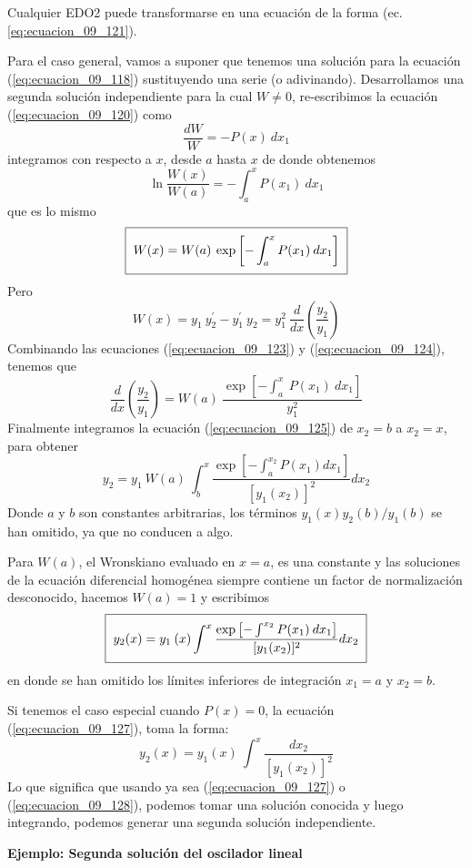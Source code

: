 Cualquier EDO2 puede transformarse en una ecuación de la forma (ec. \ref{eq:ecuacion_09_121}).
\par
Para el caso general, vamos a suponer que tenemos una solución para la ecuación (\ref{eq:ecuacion_09_118}) sustituyendo una serie (o adivinando). Desarrollamos una segunda solución independiente para la cual $W \neq 0$, re-escribimos la ecuación (\ref{eq:ecuacion_09_120}) como
\[ \dfrac{d W}{W} = - P(x) \: d x_{1} \]
integramos con respecto a $x$, desde $a$ hasta $x$ de donde obtenemos
\[ \ln \dfrac{W(x)}{W(a)} = - \int_{a}^{x} P(x_{1}) \: dx_{1}  \]
que es lo mismo
\begin{equation}
\setlength{\fboxsep}{2\fboxsep}\boxed{W(x) = W(a) \: \exp \left[ - \int_{a}^{x} P(x_{1}) \: d x_{1} \right]}
\label{eq:ecuacion_09_123}
\end{equation}
Pero
\begin{equation}
W(x) = y_{1} \: y^{\prime}_{2} - y^{\prime}_{1} \: y_{2} = y_{1}^{2} \: \dfrac{d}{dx} \left( \dfrac{y_{2}}{y_{1}} \right)
\label{eq:ecuacion_09_124}
\end{equation}
Combinando las ecuaciones (\ref{eq:ecuacion_09_123}) y (\ref{eq:ecuacion_09_124}), tenemos que
\begin{equation}
\dfrac{d}{dx} \left( \dfrac{y_{2}}{y_{1}} \right) =  W(a) \: \dfrac{\exp \left[ - \int_{a}^{x} \: P(x_{1}) \: d x_{1} \right]}{y^{2}_{1}}
\label{eq:ecuacion_09_125}
\end{equation}
Finalmente integramos la ecuación (\ref{eq:ecuacion_09_125}) de $x_{2} = b$ a $x_{2} = x$, para obtener
\begin{equation}
y_{2} = y_{1} \: W(a) \: \int_{b}^{x} \dfrac{\exp \left[ - \int_{a}^{x_{2}} P(x_{1}) d x_{1} \right]}{[y_{1}(x_{2})]^{2}} dx_{2}
\label{eq:ecuacion_09_126}
\end{equation}
Donde $a$ y $b$ son constantes arbitrarias, los términos $y_{1}(x)y_{2}(b)/y_{1}(b)$ se han omitido, ya que no conducen a algo.
\par
Para $W(a)$, el Wronskiano evaluado en $x=a$, es una constante y las soluciones de la ecuación diferencial homogénea siempre contiene un factor de normalización desconocido, hacemos $W(a)=1$ y escribimos
\begin{equation}
\setlength{\fboxsep}{2\fboxsep}\boxed{y_{2}(x) =  y_{1} \: (x) \int^{x} \dfrac{\exp \left[ - \int^{x_{2}} P(x_{1}) \: d x_{1} \right]}{[y_{1}(x_{2})]^{2}} dx_{2}}
\label{eq:ecuacion_09_127}
\end{equation}
en donde se han omitido los límites inferiores de integración $x_{1} = a$ y $x_{2}=b$. 
\par
Si tenemos el caso especial cuando $P(x)=0$, la ecuación (\ref{eq:ecuacion_09_127}), toma la forma:
\begin{equation}
y_{2}(x) =  y_{1}(x) \: \int^{x} \dfrac{dx_{2}}{[y_{1}(x_{2})]^{2}}
\label{eq:ecuacion_09_128}
\end{equation}
Lo que significa que usando ya sea (\ref{eq:ecuacion_09_127}) o (\ref{eq:ecuacion_09_128}), podemos tomar una solución conocida y luego integrando, podemos generar una segunda solución independiente.
\par
\textbf{Ejemplo: Segunda solución del oscilador lineal}

